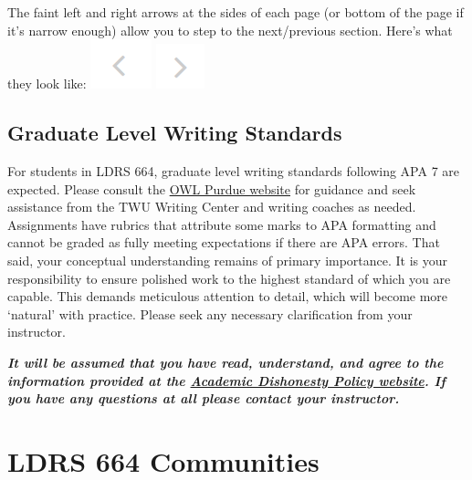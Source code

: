 \documentclass[
]{book}
\begin{document}
The faint left and right arrows at the sides of each page (or bottom of the page if it's narrow enough) allow you to step to the next/previous section. Here's what they look like:
\includegraphics{assets/course-intro/left_arrow.png} \includegraphics{assets/course-intro/right_arrow.png}

\hypertarget{graduate-level-writing-standards}{%
\section*{Graduate Level Writing Standards}\label{graduate-level-writing-standards}}

For students in LDRS 664, graduate level writing standards following APA 7 are expected. Please consult the \href{https://owl.purdue.edu/owl/research_and_citation/apa_style/apa_style_introduction.html}{OWL Purdue website} for guidance and seek assistance from the TWU Writing Center and writing coaches as needed. Assignments have rubrics that attribute some marks to APA formatting and cannot be graded as fully meeting expectations if there are APA errors. That said, your conceptual understanding remains of primary importance. It is your responsibility to ensure polished work to the highest standard of which you are capable. This demands meticulous attention to detail, which will become more `natural' with practice. Please seek any necessary clarification from your instructor.

\begin{caution}
\textbf{\emph{It will be assumed that you have read, understand, and
agree to the information provided at the
\href{https://www.twu.ca/student-handbook/university-policies/academic-misconduct/procedures-dealing-acts-academic-0}{Academic
Dishonesty Policy website}. If you have any questions at all please
contact your instructor.}}
\end{caution}

\hypertarget{ldrs-664-communities}{%
\chapter*{LDRS 664 Communities}\label{ldrs-664-communities}}
\end{document}
